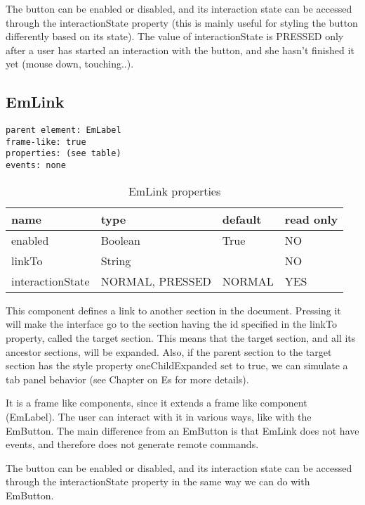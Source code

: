 The button can be enabled or disabled, and its interaction state can be accessed through the interactionState property (this is mainly useful for styling the button differently based on its state). The value of interactionState is PRESSED only after a user has started an interaction with the button, and she hasn't finished it yet (mouse down, touching..).

\subsection{EmLink}

\begin{verbatim}
parent element: EmLabel
frame-like: true
properties: (see table)
events: none
\end{verbatim}

\begin{table}[ht]
\caption{EmLink properties}
\centering
\begin{tabular}{l l l l}
\hline\hline
name & type & default & read only \\ [0.5ex]
\hline %
enabled & Boolean & True & NO \\
linkTo & String &  & NO \\
interactionState & NORMAL, PRESSED & NORMAL & YES \\ [1ex] %
\hline %
\end{tabular}

\end{table}

This component defines a link to another section in the document. Pressing it will make the interface go to the
section having the id specified in the linkTo property, called the target section. This means that the target
section, and all its ancestor sections, will be expanded. Also, if the parent section to the target section
has the style property oneChildExpanded set to true, we can simulate a tab panel behavior (see Chapter on Es for more details).

It is a frame like components, since it extends a frame like component (EmLabel). The user can interact with it in various ways, like with the EmButton. The main difference from an EmButton is that EmLink does not have events, and therefore does not generate
remote commands.

The button can be enabled or disabled, and its interaction state can be accessed through the interactionState property in
the same way we can do with EmButton.

